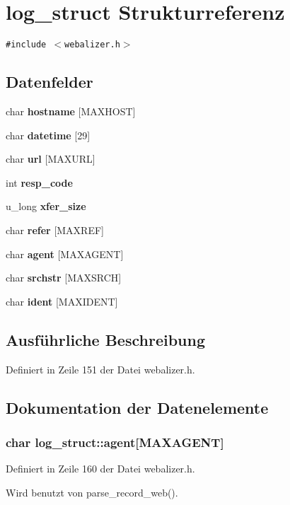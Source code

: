 \section{log\_\-struct Strukturreferenz}
\label{structlog__struct}
{\tt \#include $<$webalizer.h$>$}

\subsection*{Datenfelder}
\begin{CompactItemize}
\item 
char {\bf hostname} [MAXHOST]
\item 
char {\bf datetime} [29]
\item 
char {\bf url} [MAXURL]
\item 
int {\bf resp\_\-code}
\item 
u\_\-long {\bf xfer\_\-size}
\item 
char {\bf refer} [MAXREF]
\item 
char {\bf agent} [MAXAGENT]
\item 
char {\bf srchstr} [MAXSRCH]
\item 
char {\bf ident} [MAXIDENT]
\end{CompactItemize}


\subsection{Ausf\"{u}hrliche Beschreibung}




Definiert in Zeile 151 der Datei webalizer.h.

\subsection{Dokumentation der Datenelemente}
\subsubsection{\setlength{\rightskip}{0pt plus 5cm}char {\bf log\_\-struct::agent}[MAXAGENT]}\label{structlog__struct_b512bdcfac62ef38139eaf1701994a4f}




Definiert in Zeile 160 der Datei webalizer.h.

Wird benutzt von parse\_\-record\_\-web().
